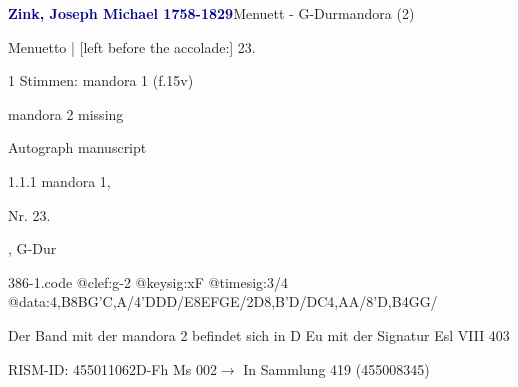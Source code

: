 \documentclass[twocolumn, 12pt]{book}
\begin{document}
\par \vspace{16pt} \textcolor{darkblue}{\textbf{Zink, Joseph Michael  1758-1829}}\hfillplus{\textbf{[386]}}\newline Menuett - G-Dur\newline mandora (2)
\par \begin{itshape}[f.15v, at left:] Menuetto | [left before the accolade:] 23.\end{itshape} 
\par \textcolor{darkblue}{}  1 Stimmen: mandora 1  (f.15v)\newline \begin{small} mandora 2 missing\end{small} \newline Autograph manuscript
\par 1.1.1  mandora 1, \begin{itshape}Nr. 23.\end{itshape}, G-Dur  
\begin{filecontents*}{386-1.code}
@clef:g-2
@keysig:xF
@timesig:3/4
@data:4,B8BG'C,A/4'DDD/E8EFGE/2D{8,B'D}/{DC}4,AA/8'D,B4GG/
\end{filecontents*}
\newline %
\par Der Band mit der mandora 2 befindet sich in D Eu mit der Signatur Esl VIII 403
\par RISM-ID: 455011062\newline D-Fh  Ms 002\newline $\rightarrow$ In Sammlung 419 (455008345)
      
\end{document}
